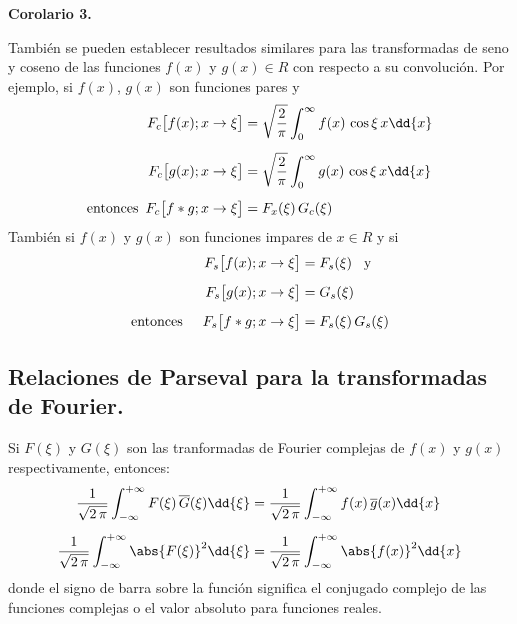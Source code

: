 \textbf{Corolario 3.}

También se pueden establecer resultados similares para las transformadas de seno y coseno de las funciones $f (x)$ y $g (x) \in R$ con respecto a su convolución. Por ejemplo, si $f (x)$, $g (x)$ son funciones pares y
\begin{align}
\begin{aligned}[b]
F_{c} \big[f(x); x \to \xi \big] &= \sqrt{\dfrac{2}{\pi}} \int_{0}^{\infty} f(x) \, \cos \xi \, x \dd{x} \\[0.5em]
F_{c} \big[g(x); x \to \xi \big] &= \sqrt{\dfrac{2}{\pi}} \int_{0}^{\infty} g(x) \, \cos \xi \, x \dd{x} \\[0.5em]
\mbox{entonces} \hspace{0.5em} F_{c} \big[f * g; x \to \xi \big] &= F_{x}(\xi) \, G_{c}(\xi)
\end{aligned}
\label{eq:ecuacion_01_28}
\end{align}
También si $f(x)$ y $g(x)$ son funciones impares de $x \in R$ y si
\begin{align}
\begin{aligned}[b]
F_{s} \big[f(x); x \to \xi \big] &= F_{s}(\xi) \hspace{0.3cm} \mbox{y} \\[0.5em]
F_{s} \big[g(x); x \to \xi \big] &= G_{s}(\xi) \\[0.5em]
\mbox{entonces} \hspace{0.5cm} F_{s} \big[f * g; x \to \xi \big] &= F_{s} (\xi) \, G_{s}(\xi) 
\end{aligned}
\label{eq:ecuacion_01_29}
\end{align}

\subsection{Relaciones de Parseval para la transformadas de Fourier.}

Si $F(\xi)$ y $G(\xi)$ son las tranformadas de Fourier complejas de $f(x)$ y $g(x)$ respectivamente, entonces:
\begin{align}
\dfrac{1}{\sqrt{2 \, \pi}} \int_{-\infty}^{+\infty} F(\xi) \, \overline{G}(\xi) \dd{\xi} &= \dfrac{1}{\sqrt{2 \, \pi}} \int_{-\infty}^{+\infty} f(x) \, \overline{g}(x) \dd{x} \label{eq:ecuacion_01_30} \\[0.5em]
\dfrac{1}{\sqrt{2 \, \pi}} \int_{-\infty}^{+\infty} \abs{F(\xi)}^{2} \dd{\xi} &= \dfrac{1}{\sqrt{2 \, \pi}} \int_{-\infty}^{+\infty} \abs{f(x)}^{2} \dd{x} \label{eq:ecuacion_01_31}
\end{align}
donde el signo de barra sobre la función significa el conjugado complejo de las funciones complejas o el valor absoluto para funciones reales.

